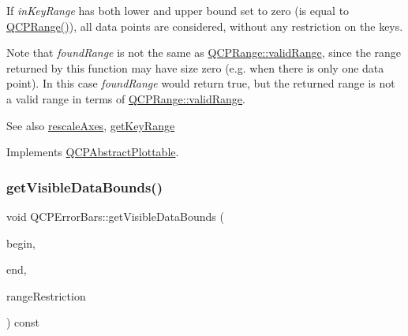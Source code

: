 If {\itshape in\+Key\+Range} has both lower and upper bound set to zero (is equal to {\ttfamily \mbox{\hyperlink{class_q_c_p_range}{Q\+C\+P\+Range()}}}), all data points are considered, without any restriction on the keys.

Note that {\itshape found\+Range} is not the same as \mbox{\hyperlink{class_q_c_p_range_ab38bd4841c77c7bb86c9eea0f142dcc0}{Q\+C\+P\+Range\+::valid\+Range}}, since the range returned by this function may have size zero (e.\+g. when there is only one data point). In this case {\itshape found\+Range} would return true, but the returned range is not a valid range in terms of \mbox{\hyperlink{class_q_c_p_range_ab38bd4841c77c7bb86c9eea0f142dcc0}{Q\+C\+P\+Range\+::valid\+Range}}.

\begin{DoxySeeAlso}{See also}
\mbox{\hyperlink{class_q_c_p_abstract_plottable_a1491c4a606bccd2d09e65e11b79eb882}{rescale\+Axes}}, \mbox{\hyperlink{class_q_c_p_error_bars_a6cac828a430d66ac77a167549d01d212}{get\+Key\+Range}} 
\end{DoxySeeAlso}


Implements \mbox{\hyperlink{class_q_c_p_abstract_plottable_a4de773988b21ed090fddd27c6a3a3dcb}{Q\+C\+P\+Abstract\+Plottable}}.

\mbox{\label{class_q_c_p_error_bars_aac9ffa98815035d300b2e9a67495ba4c}} 
\subsubsection{\texorpdfstring{getVisibleDataBounds()}{getVisibleDataBounds()}}
{\footnotesize\ttfamily void Q\+C\+P\+Error\+Bars\+::get\+Visible\+Data\+Bounds (\begin{DoxyParamCaption}\item[{Q\+C\+P\+Error\+Bars\+Data\+Container\+::const\+\_\+iterator \&}]{begin,  }\item[{Q\+C\+P\+Error\+Bars\+Data\+Container\+::const\+\_\+iterator \&}]{end,  }\item[{const \mbox{\hyperlink{class_q_c_p_data_range}{Q\+C\+P\+Data\+Range}} \&}]{range\+Restriction }\end{DoxyParamCaption}) const\hspace{0.3cm}{\ttfamily [protected]}}

\mbox{\label{class_q_c_p_error_bars_a0b6fbf3a943b4241ee485d066cc8562a}} 
